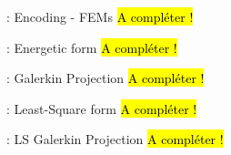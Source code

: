 \begin{frame}{\appendixname~\insertframenumber~: Encoding - FEMs}\label{frame:encoding_fems}
	\hl{A compléter !}
\end{frame}

\begin{frame}{\appendixname~\insertframenumber~: Energetic form}\label{frame:minpb_galerkin}
	\hl{A compléter !}
\end{frame}

\begin{frame}{\appendixname~\insertframenumber~: Galerkin Projection}\label{frame:galerkin_proj}
	\hl{A compléter !}
\end{frame}

\begin{frame}{\appendixname~\insertframenumber~: Least-Square form}\label{frame:minpb_leastsquare}
	\hl{A compléter !}
\end{frame}

\begin{frame}{\appendixname~\insertframenumber~: LS Galerkin Projection}\label{frame:leastsquare_proj}
	\hl{A compléter !}
\end{frame}
